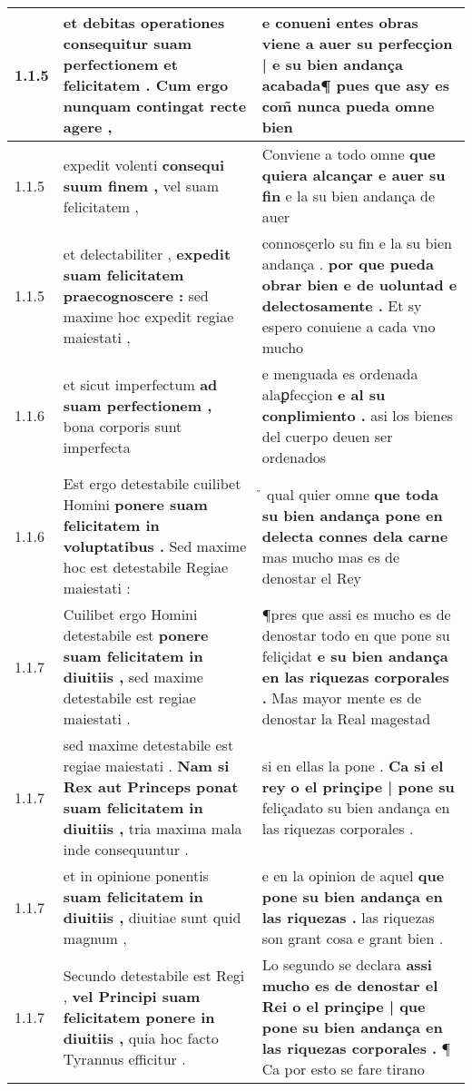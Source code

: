 \begin{tabular}{|p{1cm}|p{6.5cm}|p{6.5cm}|}
1.1.5 & et debitas operationes \textbf{ consequitur suam perfectionem et felicitatem . } Cum ergo nunquam contingat recte agere , & e conueni entes obras \textbf{ viene a auer su perfecçion | e su bien andança acabada¶ } pues que asy es com̃ nunca pueda omne bien \\\hline
1.1.5 & expedit volenti \textbf{ consequi suum finem , } vel suam felicitatem , & Conviene a todo omne \textbf{ que quiera alcançar e auer su fin } e la su bien andança de auer \\\hline
1.1.5 & et delectabiliter , \textbf{ expedit suam felicitatem praecognoscere : } sed maxime hoc expedit regiae maiestati , & connosçerlo su fin e la su bien andança . \textbf{ por que pueda obrar bien e de uoluntad e delectosamente . } Et sy espero conuiene a cada vno mucho \\\hline
1.1.6 & et sicut imperfectum \textbf{ ad suam perfectionem , } bona corporis sunt imperfecta & e menguada es ordenada alaꝑfecçion \textbf{ e al su conplimiento . } asi los bienes del cuerpo deuen ser ordenados \\\hline
1.1.6 & Est ergo detestabile cuilibet Homini \textbf{ ponere suam felicitatem in voluptatibus . } Sed maxime hoc est detestabile Regiae maiestati : & ̉ qual quier omne \textbf{ que toda su bien andança pone en delecta connes dela carne } mas mucho mas es de denostar el Rey \\\hline
1.1.7 & Cuilibet ergo Homini detestabile est \textbf{ ponere suam felicitatem in diuitiis , } sed maxime detestabile est regiae maiestati . & ¶pres que assi es mucho es de denostar todo en que pone su feliçidat \textbf{ e su bien andança en las riquezas corporales . } Mas mayor mente es de denostar la Real magestad \\\hline
1.1.7 & sed maxime detestabile est regiae maiestati . \textbf{ Nam si Rex aut Princeps ponat suam felicitatem in diuitiis , } tria maxima mala inde consequuntur . & si en ellas la pone . \textbf{ Ca si el rey o el prinçipe | pone su } feliçadato su bien andança en las riquezas corporales . \\\hline
1.1.7 & et in opinione ponentis \textbf{ suam felicitatem in diuitiis , } diuitiae sunt quid magnum , & e en la opinion de aquel \textbf{ que pone su bien andança en las riquezas . } las riquezas son grant cosa e grant bien . \\\hline
1.1.7 & Secundo detestabile est Regi , \textbf{ vel Principi suam felicitatem ponere in diuitiis , } quia hoc facto Tyrannus efficitur . & Lo segundo se declara \textbf{ assi mucho es de denostar el Rei o el prinçipe | que pone su bien andança en las riquezas corporales . } ¶ Ca por esto se fare tirano \\\hline

\end{tabular}
